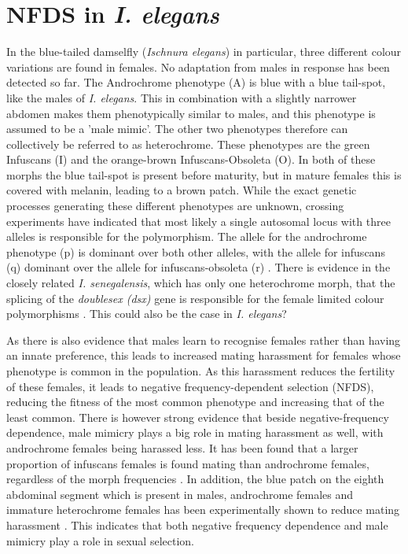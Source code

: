 \documentclass{article}
\begin{document}
\section{NFDS in \textit{I. elegans}}
In the blue-tailed damselfly (\textit{Ischnura elegans}) in particular, three different colour variations are found in females. No adaptation from males in response has been detected so far. The Androchrome phenotype (A) is blue with a blue tail-spot, like the males of \textit{I. elegans}. This in combination with a slightly narrower abdomen makes them phenotypically similar to males, and this phenotype is assumed to be a 'male mimic'. The other two phenotypes therefore can collectively be referred to as heterochrome. These phenotypes are the green Infuscans (I) and the orange-brown Infuscans-Obsoleta (O). In both of these morphs the blue tail-spot is present before maturity, but in mature females this is covered with melanin, leading to a brown patch. While the exact genetic processes generating these different phenotypes are unknown, crossing experiments have indicated that most likely a single autosomal locus with three alleles is responsible for the polymorphism\cite{Cordero1990}. The allele for the androchrome phenotype (p) is dominant over both other alleles, with the allele for infuscans (q) dominant over the allele for infuscans-obsoleta (r) \cite{Cordero1990}. There is evidence in the closely related \textit{I. senegalensis}, which has only one heterochrome morph, that the splicing of the \textit{doublesex (dsx)} gene is responsible for the female limited colour polymorphisms \cite{Takahashi2019}. This could also be the case in \textit{I. elegans}?

As there is also evidence that males learn to recognise females rather than having an innate preference, this leads to increased mating harassment for females whose phenotype is common in the population. As this harassment reduces the fertility of these females, it leads to negative frequency-dependent selection (NFDS), reducing the fitness of the most common phenotype and increasing that of the least common.
There is however strong evidence that beside negative-frequency dependence, male mimicry plays a big role in mating harassment as well, with androchrome females being harassed less. It has been found that a larger proportion of infuscans females is found mating than androchrome females, regardless of the morph frequencies \cite{Gosden2009}. In addition, the blue patch on the eighth abdominal segment which is present in males, androchrome females and immature heterochrome females has been experimentally shown to reduce mating harassment \cite{Willink2019}. This indicates that both negative frequency dependence and male mimicry play a role in sexual selection.
\end{document}
